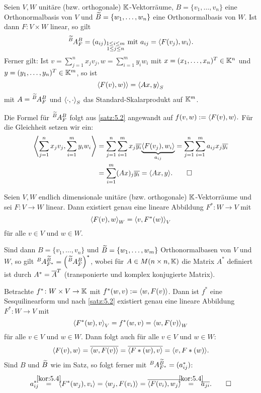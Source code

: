 \begin{korollar}
	\label{kor:5.4}
	Seien $V,W$ unitäre (bzw. orthogonale) $\mathbb{K}$-Vektorräume, $B = \{v_1,\dots,v_n\}$ eine Orthonormalbasis von $V$ und $\widetilde{B} = \{w_1,\dots,w_n\}$ eine Orthonormalbasis von $W$.
	Ist dann $F \colon V \times W$ linear, so gilt
	\[
		\mat{A}{\wt{B}}{B}{F} = (a_{ij})_{\substack{1 \leq i \leq m \\ 1 \leq j \leq n}} \text{ mit } a_{ij} = \sk{F(v_j),w_i}.
	\]
	Ferner gilt:
	Ist $v = \sum_{j=1}^{n} x_j v_j, w = \sum_{i=1}^{m} y_i w_i$ mit $x = (x_1,\dots,x_n)^T \in \mathbb{K}^n$ und $y = (y_1,\dots,y_n)^T \in \mathbb{K}^m$, so ist
	\[
		\left\langle F(v),w)\right\rangle = \left\langle Ax,y\right\rangle_S
	\]
	mit $A = \mat{A}{\wt{B}}{B}{F}$ und $\left\langle\cdot,\cdot\right\rangle_S$ das Standard-Skalarprodukt auf $\mathbb{K}^m$.
\end{korollar}
\newpage
\begin{beweis}
	Die Formel für $\mat{A}{\wt{B}}{B}{F}$ folgt aus \autoref{satz:5.2} angewandt auf $f(v,w) := \sk{F(v),w}.$
	Für die Gleichheit setzen wir ein:
	\begin{align*}
		\sk{\sum_{j=1}^{n} x_j v_j, \sum_{i=1}^{m} y_i w_i} &= \sum_{j=1}^{n} \sum_{i=1}^{m} x_j \ol{y_i} \Underbrace{\sk{F(v_j),w_i}}{a_{ij}} = \sum_{j=1}^{n} \sum_{i=1}^{m} a_{ij} x_j \ol{y_i} \\
		&= \sum_{i=1}^{m} (Ax)_j \ol{y_i} = \sk{Ax,y}. \qedhere
	\end{align*}
\end{beweis}

\begin{satz}
	\label{satz:5.5}
	Seien $V,W$ endlich dimensionale unitäre (bzw. orthogonale) $\mathbb{K}$-Vektorräume und sei $F \colon V \rightarrow W$ linear.
	Dann existiert genau eine lineare Abbildung $F^* \colon W \rightarrow V$ mit
	\[
		\left\langle F(v),w\right\rangle_W = \left\langle v,F^*(w)\right\rangle_V
	\]
	für alle $v \in V$ und $w \in W$.
	
	Sind dann $B = \{v_1,\dots,v_n\}$ und $\widetilde{B} = \{w_1,\dots,w_m\}$ Orthonormalbasen von $V$ und $W$, so gilt $\mat{A}{B}{\wt{B}}{F^*} = \enb{\mat{A}{\wt{B}}{B}{F}}^*$, wobei für $A \in M(n \times n, \mathbb{K})$ die Matrix $A^*$ definiert ist durch $A^* = \overline{A}^T$ (transponierte und komplex konjugierte Matrix).
\end{satz}

\begin{beweis}
	Betrachte $f^*\colon W \times V \rightarrow \mathbb{K}$ mit $f^*(w,v) := \left\langle w,F(v)\right\rangle$.
	Dann ist $f^*$ eine Sesquilinearform und nach \autoref{satz:5.2} existiert genau eine lineare Abbildung $F^*\colon W \rightarrow V$ mit
	\[
		\left\langle F^*(w),v\right\rangle_V = f^*(w,v) = \left\langle w,F(v)\right\rangle_W
	\]
	für alle $v \in V$ und $w \in W$.
	Dann folgt auch für alle $v \in V$ und $w \in W$:
	\[
		\sk{F(v),w} = \ol{\sk{w,F(v)}} = \ol{\sk{F*(w),v}} = \sk{v,F*(w)}.
	\]
	Sind $B$ und $\widetilde{B}$ wie im Satz, so folgt ferner mit $\mat{A}{B}{\wt{B}}{F^*} = (a^*_{ij})$:
	\[
		a^*_{ij} \stack{\ref{kor:5.4}}{=} \sk{F^*(w_j),v_i} = \sk{w_j,F(v_i)} = \ol{\sk{F(v_i),w_j}} \stack{\ref{kor:5.4}}{=} \ol{a_{ji}}. \qedhere
	\]
\end{beweis}

